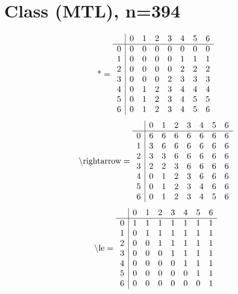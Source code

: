 \documentclass[11pt]{article}
\begin{document}
\section{Class (MTL), n=394}
\[\text{*} = 
\begin{array}{r | r r r r r r r}
 & 0 & 1 & 2 & 3 & 4 & 5 & 6 \\ \hline
0 & 0 & 0 & 0 & 0 & 0 & 0 & 0 \\
1 & 0 & 0 & 0 & 0 & 1 & 1 & 1 \\
2 & 0 & 0 & 0 & 0 & 2 & 2 & 2 \\
3 & 0 & 0 & 0 & 2 & 3 & 3 & 3 \\
4 & 0 & 1 & 2 & 3 & 4 & 4 & 4 \\
5 & 0 & 1 & 2 & 3 & 4 & 5 & 5 \\
6 & 0 & 1 & 2 & 3 & 4 & 5 & 6 \\
\end{array}
\]
\[\text{\textbackslash rightarrow} = 
\begin{array}{r | r r r r r r r}
 & 0 & 1 & 2 & 3 & 4 & 5 & 6 \\ \hline
0 & 6 & 6 & 6 & 6 & 6 & 6 & 6 \\
1 & 3 & 6 & 6 & 6 & 6 & 6 & 6 \\
2 & 3 & 3 & 6 & 6 & 6 & 6 & 6 \\
3 & 2 & 2 & 3 & 6 & 6 & 6 & 6 \\
4 & 0 & 1 & 2 & 3 & 6 & 6 & 6 \\
5 & 0 & 1 & 2 & 3 & 4 & 6 & 6 \\
6 & 0 & 1 & 2 & 3 & 4 & 5 & 6 \\
\end{array}
\]
\[\text{\textbackslash le} = 
\begin{array}{r | r r r r r r r}
 & 0 & 1 & 2 & 3 & 4 & 5 & 6 \\ \hline
0 & 1 & 1 & 1 & 1 & 1 & 1 & 1 \\
1 & 0 & 1 & 1 & 1 & 1 & 1 & 1 \\
2 & 0 & 0 & 1 & 1 & 1 & 1 & 1 \\
3 & 0 & 0 & 0 & 1 & 1 & 1 & 1 \\
4 & 0 & 0 & 0 & 0 & 1 & 1 & 1 \\
5 & 0 & 0 & 0 & 0 & 0 & 1 & 1 \\
6 & 0 & 0 & 0 & 0 & 0 & 0 & 1 \\
\end{array}
\]
\end{document}
